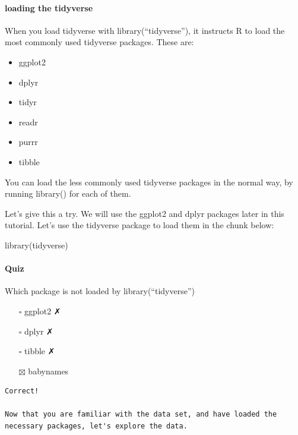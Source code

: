 \documentclass[
]{article}
\newenvironment{Shaded}{\begin{snugshade}}{\end{snugshade}}
\newcommand{\FunctionTok}[1]{\textcolor[rgb]{0.00,0.00,0.00}{#1}}
\newcommand{\NormalTok}[1]{#1}
\providecommand{\tightlist}{%
  \setlength{\itemsep}{0pt}\setlength{\parskip}{0pt}}
\begin{document}
\hypertarget{loading-the-tidyverse}{%
\paragraph{loading the tidyverse}\label{loading-the-tidyverse}}

When you load tidyverse with library(``tidyverse''), it instructs R to
load the most commonly used tidyverse packages. These are:

\begin{itemize}
\tightlist
\item
  ggplot2
\item
  dplyr
\item
  tidyr
\item
  readr
\item
  purrr
\item
  tibble
\end{itemize}

You can load the less commonly used tidyverse packages in the normal
way, by running library() for each of them.

Let's give this a try. We will use the ggplot2 and dplyr packages later
in this tutorial. Let's use the tidyverse package to load them in the
chunk below:

\begin{Shaded}
\begin{Highlighting}[]
\FunctionTok{library}\NormalTok{(tidyverse)}
\end{Highlighting}
\end{Shaded}

\hypertarget{quiz}{%
\paragraph{Quiz}\label{quiz}}

Which package is not loaded by library(``tidyverse'')

\begin{itemize}
\tightlist
\item[$\square$]
  ggplot2 ✗
\item[$\square$]
  dplyr ✗
\item[$\square$]
  tibble ✗
\item[$\boxtimes$]
  babynames
\end{itemize}

\begin{verbatim}
Correct! 

Now that you are familiar with the data set, and have loaded the necessary packages, let's explore the data.
\end{verbatim}
\end{document}
